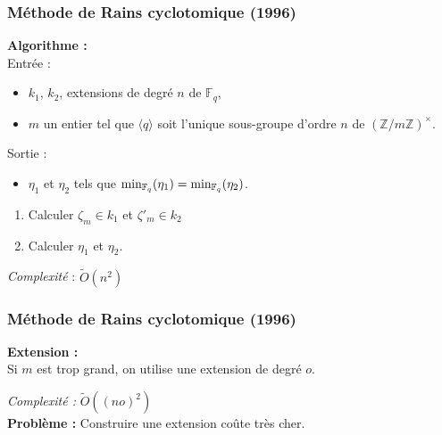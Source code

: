 \documentclass{beamer} %
\numberwithin{equation}{section}
\newcommand\zmodninv[1]{(\mathbb{Z}/#1\mathbb{Z})^{\times}}
\newcommand\GF[1]{\mathbb{F}_{#1}}
\newcommand\Tr[1]{\textup{Tr}\left(#1\right)}
\newcommand\tO[1]{\widetilde{O}(#1)}
\newcommand\groupgen[1]{\langle{#1}\rangle}
\begin{document}
\begin{frame}
\frametitle{Méthode de Rains cyclotomique (1996)}
\textbf{Algorithme :}\\
Entrée :
\begin{itemize}
	\item $k_1$, $k_2$, extensions de degré $n$ de $\GF{q}$,
	\item $m$ un entier tel que $\groupgen{q}$ soit l'unique sous-groupe 
		d'ordre $n$ de $\zmodninv{m}$.
\end{itemize}
Sortie :\\
\begin{itemize}
\item $\eta_1$ et $\eta_2$ tels que $\textup{min}_{\GF{q}}(\eta_1) =
\textup{min}_{\GF{q}}(\eta_2)$.
\end{itemize}
\begin{enumerate}
	\item Calculer $\zeta_m\in k_1$ et $\zeta'_m\in k_2$
	\item Calculer $\eta_1$ et $\eta_2$.
\end{enumerate}
\vspace{0.5cm}
\emph{Complexité} : $\tO{n^2}$\\
\end{frame}
\begin{frame}[fragile]
\frametitle{Méthode de Rains cyclotomique (1996)}
\textbf{Extension :}\\
Si $m$ est trop grand, on utilise une extension de degré $o$.
\begin{center}
\end{center}
\vspace{0.3cm}
\emph{Complexité :} $\tO{(no)^2}$\\
\textbf{Problème :} Construire une extension coûte très cher.
\end{frame}
\end{document}
